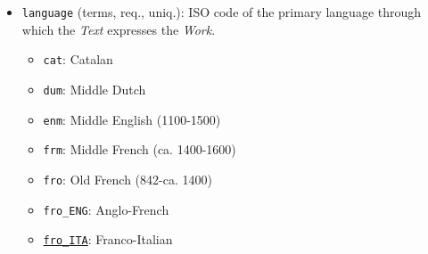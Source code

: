 \begin{itemize}
\begin{multicols}{2}
\begin{itemize}
\begin{itemize}
                \end{itemize}
            \item Relevant to Middle Dutch tradition
                \begin{itemize}
                    \item \texttt{ridderepiek}
                    \item \texttt{ridderroman}
                    \item \texttt{rijmkronieken}
                    \item {}
                \end{itemize}
            \item Relevant to Middle English, Middle Irish, Middle Welsh traditions
            \begin{itemize}
                \item \texttt{romance}
                \item {}
            \end{itemize}
            \item Relevant to Middle High German tradition
            \begin{itemize}
             \item \texttt{Roman}
                \item {}
            \end{itemize}
        \end{itemize}
    \end{multicols}
    \item \texttt{language} (terms, req., uniq.): ISO code of the primary language through which the \textit{Text} expresses the \textit{Work}.
    \begin{multicols}{2}
        \begin{itemize}
            \item \texttt{cat}: Catalan
            \item \texttt{dum}: Middle Dutch
            \item \texttt{enm}: Middle English (1100-1500)
            \item \texttt{frm}: Middle French (ca. 1400-1600)
            \item \texttt{fro}: Old French (842-ca. 1400)
            \item \texttt{fro\_ENG}: Anglo-French
            \item \href{https://www.wikidata.org/wiki/Q54879035}{\texttt{fro\_ITA}}: Franco-Italian

\end{itemize}
\end{multicols}
\end{itemize}
